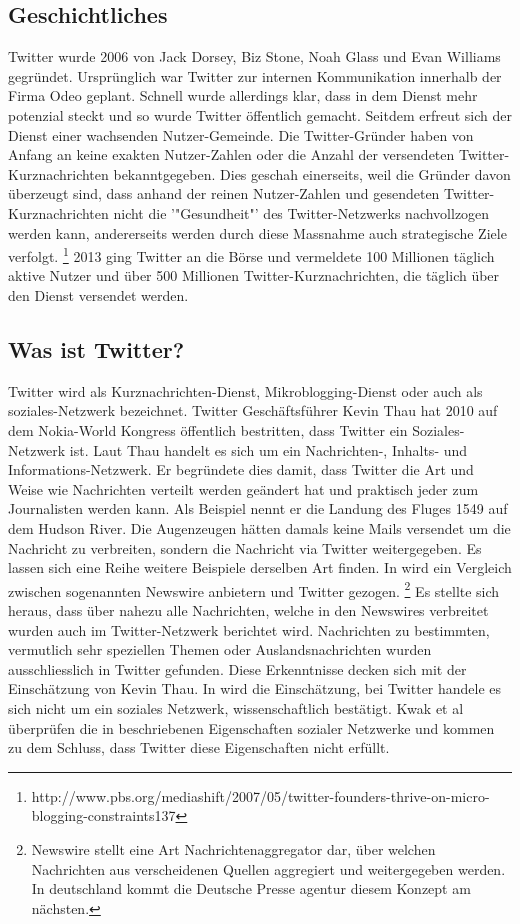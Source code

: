 		\subsection{Geschichtliches}
		Twitter wurde 2006 von Jack Dorsey, Biz Stone, Noah Glass und Evan Williams gegründet.
		Ursprünglich war Twitter zur internen Kommunikation innerhalb der Firma Odeo geplant.
		Schnell wurde allerdings klar, dass in dem Dienst mehr potenzial steckt und so wurde Twitter öffentlich gemacht.
		Seitdem erfreut sich der Dienst einer wachsenden Nutzer-Gemeinde.
		Die Twitter-Gründer haben von Anfang an keine exakten Nutzer-Zahlen oder die Anzahl der versendeten Twitter-Kurznachrichten bekanntgegeben.
		Dies geschah einerseits, weil die Gründer davon überzeugt sind, dass anhand der reinen Nutzer-Zahlen und gesendeten Twitter-Kurznachrichten nicht die '"Gesundheit"' des Twitter-Netzwerks nachvollzogen werden kann, andererseits werden durch diese Massnahme auch strategische Ziele verfolgt.  \footnote{http://www.pbs.org/mediashift/2007/05/twitter-founders-thrive-on-micro-blogging-constraints137}
		2013 ging Twitter an die Börse und vermeldete 100 Millionen täglich aktive Nutzer und über 500 Millionen Twitter-Kurznachrichten, die täglich über den Dienst versendet werden. 

		\subsection{Was ist Twitter?}
		Twitter wird als Kurznachrichten-Dienst, Mikroblogging-Dienst oder auch als soziales-Netzwerk bezeichnet. 
		Twitter Geschäftsführer Kevin Thau hat 2010 auf dem Nokia-World Kongress öffentlich bestritten, dass Twitter ein Soziales-Netzwerk ist. 
		Laut Thau handelt es sich um ein Nachrichten-, Inhalts- und Informations-Netzwerk. 
		Er begründete dies damit, dass Twitter die Art und Weise wie Nachrichten verteilt werden geändert hat und praktisch jeder zum Journalisten werden kann. 
		Als Beispiel nennt er die Landung des Fluges 1549 auf dem Hudson River. 
		Die Augenzeugen hätten damals keine Mails versendet um die Nachricht zu verbreiten, sondern die Nachricht via Twitter weitergegeben.
		Es lassen sich eine Reihe weitere Beispiele derselben Art finden. 
		In \cite{Petrovic2013} wird ein Vergleich zwischen sogenannten Newswire anbietern und Twitter gezogen. \footnote{Newswire stellt eine Art Nachrichtenaggregator dar, über welchen Nachrichten aus verscheidenen Quellen aggregiert und weitergegeben werden. In deutschland kommt die Deutsche Presse agentur diesem Konzept am nächsten.}
		Es stellte sich heraus, dass über nahezu alle Nachrichten, welche in den Newswires verbreitet wurden auch im Twitter-Netzwerk berichtet wird.
		Nachrichten zu bestimmten, vermutlich sehr speziellen Themen oder Auslandsnachrichten wurden ausschliesslich in Twitter gefunden. 
		Diese Erkenntnisse decken sich mit der Einschätzung von Kevin Thau. 
		In \cite{Kwak2010} wird die Einschätzung, bei Twitter handele es sich nicht um ein soziales Netzwerk, wissenschaftlich bestätigt.
		Kwak et al überprüfen die in \cite{Newman2003} beschriebenen Eigenschaften sozialer Netzwerke und kommen zu dem Schluss, dass Twitter diese Eigenschaften nicht erfüllt.	


